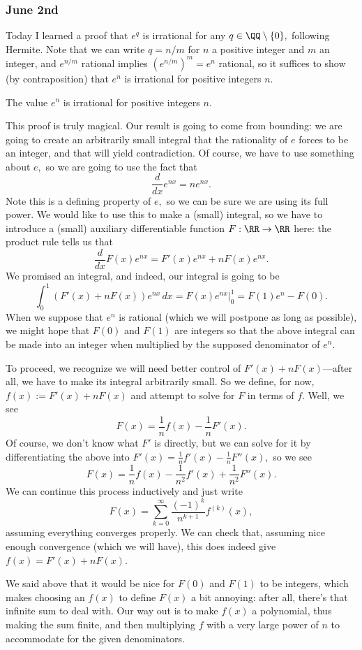 \subsubsection{June 2nd}
Today I learned a proof that $e^q$ is irrational for any $q\in\QQ\setminus\{0\},$ following Hermite. Note that we can write $q=n/m$ for $n$ a positive integer and $m$ an integer, and $e^{n/m}$ rational implies $\left(e^{n/m}\right)^m=e^n$ rational, so it suffices to show (by contraposition) that $e^n$ is irrational for positive integers $n.$
\begin{theorem}
    The value $e^n$ is irrational for positive integers $n.$
\end{theorem}
This proof is truly magical. Our result is going to come from bounding: we are going to create an arbitrarily small integral that the rationality of $e$ forces to be an integer, and that will yield contradiction. Of course, we have to use something about $e,$ so we are going to use the fact that
\[\frac d{dx}e^{nx}=ne^{nx}.\]
Note this is a defining property of $e,$ so we can be sure we are using its full power. We would like to use this to make a (small) integral, so we have to introduce a (small) auxiliary differentiable function $F:\RR\to\RR$ here: the product rule tells us that
\[\frac d{dx}F(x)e^{nx}=F'(x)e^{nx}+nF(x)e^{nx}.\]
We promised an integral, and indeed, our integral is going to be
\[\int_0^1\left(F'(x)+nF(x)\right)e^{nx}\,dx=F(x)e^{nx}\bigg|_0^1=F(1)e^n-F(0).\]
When we suppose that $e^n$ is rational (which we will postpone as long as possible), we might hope that $F(0)$ and $F(1)$ are integers so that the above integral can be made into an integer when multiplied by the supposed denominator of $e^n.$

To proceed, we recognize we will need better control of $F'(x)+nF(x)$---after all, we have to make its integral arbitrarily small. So we define, for now, $f(x):=F'(x)+nF(x)$ and attempt to solve for $F$ in terms of $f.$ Well, we see
\[F(x)=\frac1nf(x)-\frac1nF'(x).\]
Of course, we don't know what $F'$ is directly, but we can solve for it by differentiating the above into $F'(x)=\frac1nf'(x)-\frac1nF''(x),$ so we see
\[F(x)=\frac1nf(x)-\frac1{n^2}f'(x)+\frac1{n^2}F''(x).\]
We can continue this process inductively and just write
\[F(x)=\sum_{k=0}^\infty\frac{(-1)^k}{n^{k+1}}f^{(k)}(x),\]
assuming everything converges properly. We can check that, assuming nice enough convergence (which we will have), this does indeed give $f(x)=F'(x)+nF(x).$

We said above that it would be nice for $F(0)$ and $F(1)$ to be integers, which makes choosing an $f(x)$ to define $F(x)$ a bit annoying: after all, there's that infinite sum to deal with. Our way out is to make $f(x)$ a polynomial, thus making the sum finite, and then multiplying $f$ with a very large power of $n$ to accommodate for the given denominators.

